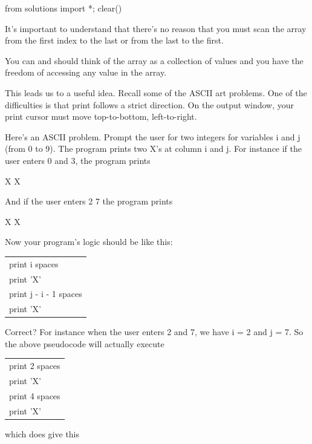 \begin{python0}
from solutions import *; clear()
\end{python0}

It's important to understand that there's no reason that you must scan the array from the first index to the last or from the last to the first.

You can and should think of the array as a collection of values and you have the freedom of accessing any value in the array.

This leads us to a useful idea. Recall some of the ASCII art problems. One of the difficulties is that print follows a strict direction. On the output window, your print cursor must move top-to-bottom, left-to-right.

Here's an ASCII problem. Prompt the user for two integers for variables i and j (from 0 to 9). The program prints two X's at column i and j. For instance if the user enters 0 and 3, the program prints

\begin{consolethree}
X X 
\end{consolethree}

And if the user enters 2 7 the program prints

\begin{consolethree}
 X     X 
\end{consolethree}

Now your program's logic should be like this:\\

\begin{tabular}{l}
print i spaces\\
print 'X'\\
print j - i - 1 spaces\\
print 'X'\\
\end{tabular}

Correct? For instance when the user enters 2 and 7, we have i = 2 and j = 7. So the above pseudocode will actually execute\\

\begin{tabular}{l}
print 2 spaces\\
print 'X'\\
print 4 spaces\\
print 'X'\\
\end{tabular}

which does give this

